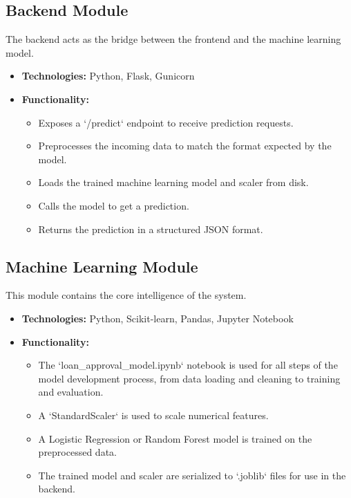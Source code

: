 \documentclass{report}
\begin{document}
\subsection{Backend Module}
The backend acts as the bridge between the frontend and the machine learning model.
\begin{itemize}
    \item \textbf{Technologies:} Python, Flask, Gunicorn
    \item \textbf{Functionality:}
    \begin{itemize}
        \item Exposes a `/predict` endpoint to receive prediction requests.
        \item Preprocesses the incoming data to match the format expected by the model.
        \item Loads the trained machine learning model and scaler from disk.
        \item Calls the model to get a prediction.
        \item Returns the prediction in a structured JSON format.
    \end{itemize}
\end{itemize}

\subsection{Machine Learning Module}
This module contains the core intelligence of the system.
\begin{itemize}
    \item \textbf{Technologies:} Python, Scikit-learn, Pandas, Jupyter Notebook
    \item \textbf{Functionality:}
    \begin{itemize}
        \item The `loan_approval_model.ipynb` notebook is used for all steps of the model development process, from data loading and cleaning to training and evaluation.
        \item A `StandardScaler` is used to scale numerical features.
        \item A Logistic Regression or Random Forest model is trained on the preprocessed data.
        \item The trained model and scaler are serialized to `.joblib` files for use in the backend.
    \end{itemize}
\end{itemize}
\end{document}
